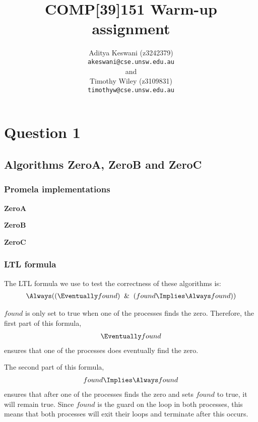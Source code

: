 \documentclass[12pt,a4paper]{scrartcl}
\begin{document}
\title{COMP[39]151 Warm-up assignment}
\author{Aditya Keswani (z3242379) \\ 
        \texttt{akeswani@cse.unsw.edu.au} \\ 
        and \\ 
        Timothy Wiley (z3109831) \\
        \texttt{timothyw@cse.unsw.edu.au} }

\maketitle

\section{Question 1}

\subsection{Algorithms ZeroA, ZeroB and ZeroC}

\subsubsection{Promela implementations}

\textbf{ZeroA}

\textbf{ZeroB}

\textbf{ZeroC}

\subsubsection{LTL formula}

The LTL formula we use to test the correctness of these algorithms is:
\begin{align} \Always ( ( \Eventually found ) \And ( found \Implies \Always found ) ) \end{align}

$found$ is only set to true when one of the processes finds the zero. Therefore, the first part of this formula, 
\begin{align} \Eventually found \end{align}
ensures that one of the processes does eventually find the zero. 

The second part of this formula, 
\begin{align} found \Implies \Always found \end{align} 
ensures that after one of the processes finds the zero and sets $found$ to true, it will remain true. Since $found$ is the guard on the loop in both processes, this means that both processes will exit their loops and terminate after this occurs.
\end{document}
